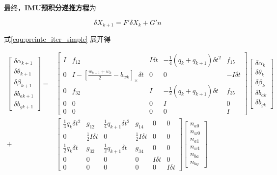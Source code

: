 \documentclass[12pt,a4paper]{article}
\begin{document}
最终，\textbf{IMU预积分递推方程}为

\begin{equation}
\label{equ:preinte_iter_simple}
\delta X_{k+1} = F' \delta X_k + G'n
\end{equation}

式\eqref{equ:preinte_iter_simple} 展开得

\begin{equation}
\label{equ:preinte_iter_complete}
\begin{aligned}
\begin{bmatrix}
\delta \alpha_{k+1} \\
\delta \theta_{k+1} \\
\delta \beta_{k+1} \\
\delta b_{a{}{k+1}} \\
\delta b_{g{}{k+1}}
\end{bmatrix} =&
\begin{bmatrix}
I & f_{12} & I\delta t & -\frac{1}{4}(q_{k}+q_{k+1})\delta t^{2} & f_{15} \\
0 & I-[\frac{w_{k+1}+w_{k}}{2}-b_{wk}]_{\times } \delta t & 0 & 0 & -I\delta t \\
0 & f_{32} & I & -\frac{1}{2}(q_{k}+q_{k+1})\delta t & f_{35} \\
0 & 0 & 0 & I & 0 \\
0 & 0 & 0 & 0 & I
\end{bmatrix}
\begin{bmatrix}
\delta \alpha_{k} \\
\delta \theta_{k} \\
\delta \beta_{k} \\
\delta b_{a{}{k}} \\
\delta b_{g{}{k}}
\end{bmatrix} \\
+&
\begin{bmatrix}
\frac{1}{4}q_{k}\delta t^{2} & g_{12} & \frac{1}{4}q_{k+1}\delta t^{2} & g_{14} & 0 & 0 \\
0 & \frac{1}{2}I\delta t & 0 & \frac{1}{2}I\delta t & 0 & 0 \\
\frac{1}{2}q_{k}\delta t & g_{32} & \frac{1}{2}q_{k+1}\delta t & g_{34} & 0 & 0 \\
0 & 0 & 0 & 0 & I\delta t & 0 \\
0 & 0 & 0 & 0 & 0 & I\delta t
\end{bmatrix}
\begin{bmatrix}
n_{a0}\\
n_{w0}\\
n_{a1}\\
n_{w1}\\
n_{ba}\\
n_{bg}
\end{bmatrix}
\end{aligned}
\end{equation}
\end{document}
